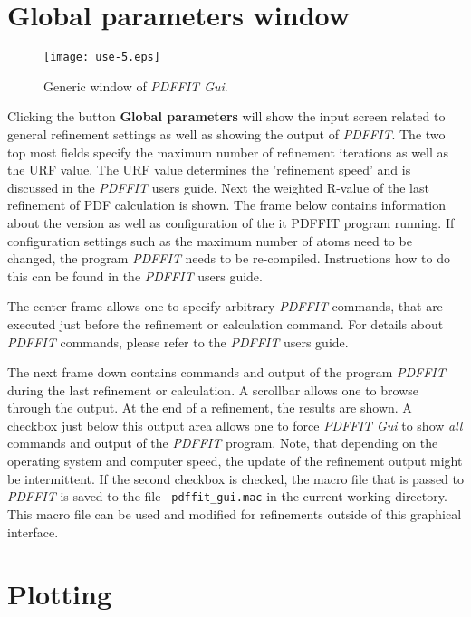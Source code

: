 \section{Global parameters window}

\begin{figure}[!t]
   \centering
   \texttt{[image: use-5.eps]}
   \caption{Generic window of {\it PDFFIT Gui}.}
   \label{fig_use5}
\end{figure}

Clicking the button {\bf Global parameters} will show the input
screen related to general refinement settings as well as showing the
output of {\it PDFFIT}. The two top most fields specify the maximum
number of refinement iterations as well as the URF value. The URF
value determines the 'refinement speed' and is discussed in the {\it
PDFFIT} users guide. Next the weighted R-value of the last
refinement of PDF calculation is shown. The frame below contains
information about the version as well as configuration of the {it
PDFFIT} program running. If configuration settings such as the
maximum number of atoms need to be changed, the program {\it PDFFIT}
needs to be re-compiled. Instructions how to do this can be found in
the {\it PDFFIT} users guide. \par

The center frame allows one to specify arbitrary {\it PDFFIT}
commands, that are executed just before the refinement or
calculation command. For details about {\it PDFFIT} commands, please
refer to the {\it PDFFIT} users guide.

The next frame down contains commands and output of the program {\it
PDFFIT} during the last refinement or calculation. A scrollbar
allows one to browse through the output. At the end of a refinement,
the results are shown. A checkbox just below this output area allows
one to force {\it PDFFIT Gui} to show {\it all} commands and output
of the {\it PDFFIT} program. Note, that depending on the operating
system and computer speed, the update of the refinement output might
be intermittent. If the second checkbox is checked, the macro file
that is passed to {\it PDFFIT} is saved to the file {\tt
pdffit\_gui.mac} in the current working directory. This macro file
can be used and modified for refinements outside of this graphical
interface.

\section{Plotting}


